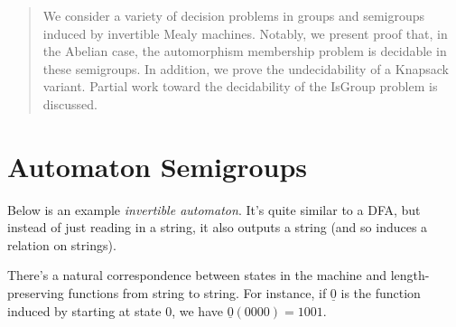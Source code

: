 \documentclass[a0]{a0poster}
\theoremstyle{pleasant}
\newcommand{\0}{\underline{0}}
\newcommand{\1}{\underline{1}}
\newcommand{\2}{\underline{2}}
\begin{document}
\begin{multicols}{3} %



\begin{abstract}
\large
  We consider a variety of decision problems in groups and semigroups
  induced by invertible Mealy machines. Notably, we present proof
  that, in the Abelian case, the automorphism membership problem is
  decidable in these semigroups. In addition, we prove the
  undecidability of a Knapsack variant. Partial work toward the
  decidability of the IsGroup problem is discussed.
\end{abstract}

\section*{Automaton Semigroups}

\large Below is an example \textit{invertible automaton}. It's quite
similar to a DFA, but instead of just reading in a string, it also
outputs a string (and so induces a relation on strings).

\begin{center}
\end{center}
There's a natural correspondence between states in the machine and
length-preserving functions from string to string. For instance, if
$\underline{0}$ is the function induced by starting at state 0, we
have $\underline{0}(0000) = 1001$.


\end{multicols}
\end{document}
